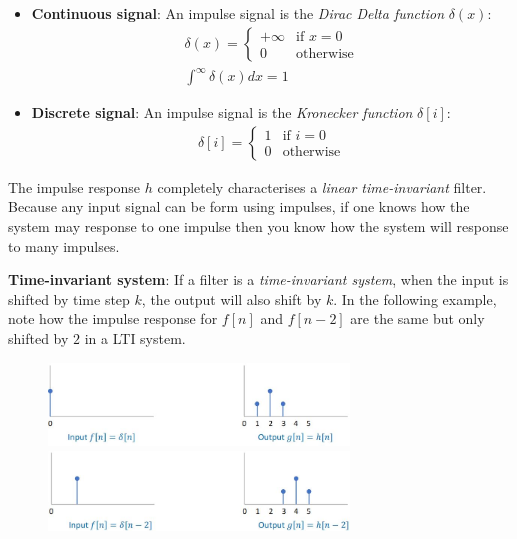 \documentclass{report}
\begin{document}
\begin{itemize}
    \item \textbf{Continuous signal}: An impulse signal is the \textit{Dirac
    Delta function} $\delta(x)$:
    \begin{gather*}
        \delta(x) = \begin{cases}
            +\infty & \text{if } x = 0 \\
            0 & \text{otherwise}
        \end{cases} \\
        \int^{\infty}\delta (x) dx = 1
    \end{gather*}

    \item \textbf{Discrete signal}: An impulse signal is the \textit{Kronecker
    function} $\delta[i]$: 
    \begin{gather*}
        \delta[i] = \begin{cases}
            1 & \text{if } i = 0 \\
            0 & \text{otherwise}
        \end{cases}
    \end{gather*}
\end{itemize}

The impulse response $h$ completely characterises a \textit{linear
time-invariant} filter. Because any input signal can be form using impulses, if
one knows how the system may response to one impulse then you know how the system
will response to many impulses. 

\pagebreak

\textbf{Time-invariant system}: If a filter is a \textit{time-invariant system},
when the input is shifted by time step $k$, the output will also shift by $k$.
In the following example, note how the impulse response for $f[n]$ and $f[n-2]$
are the same but only shifted by $2$ in a LTI system.
\begin{figure}[h]
    \centering
    \includegraphics[width=8cm]{Impulse response shift 1.JPG} \\
    \includegraphics[width=8cm]{Impulse response shift 2.JPG}
\end{figure}
\end{document}
